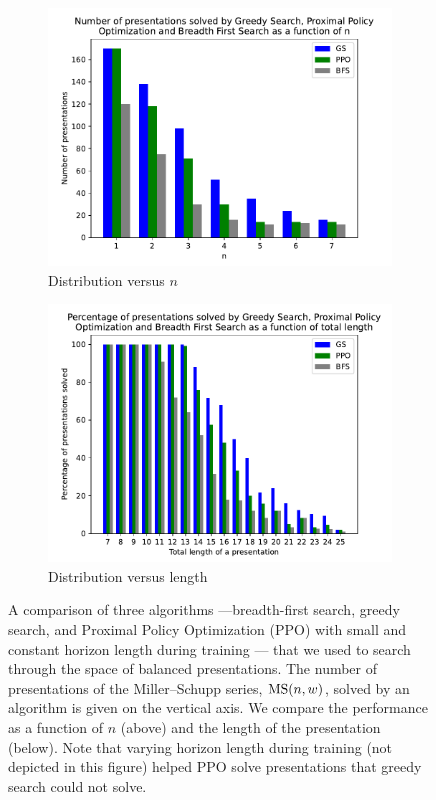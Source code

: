 \begin{figure}
	\centering
	\begin{subfigure}[b]{0.45\textwidth}
	\includegraphics[width=1.1\textwidth]{fig/performance_vs_n.pdf}
		\caption{Distribution versus $n$}
		\label{fig:performance_vs_n}
	\end{subfigure}
	\begin{subfigure}[b]{0.45\textwidth}
		\centering        \includegraphics[width=1.1\textwidth]{fig/performance_vs_length.pdf}
		\caption{Distribution versus length}
		\label{fig:performance_vs_length}
	\end{subfigure}
	\caption{A comparison of three algorithms ---breadth-first search, greedy search, and Proximal Policy Optimization (PPO) with small and constant horizon length during training --- that we used to search through the space of balanced presentations. The number of presentations of the Miller--Schupp series, $\text{MS}(n, w)$, solved by an algorithm is given on the vertical axis. We compare the performance as a function of $n$ (above) and the length of the presentation (below). Note that varying horizon length during training (not depicted in this figure) helped PPO solve presentations that greedy search could not solve.}
	\label{fig:performance}
\end{figure}

